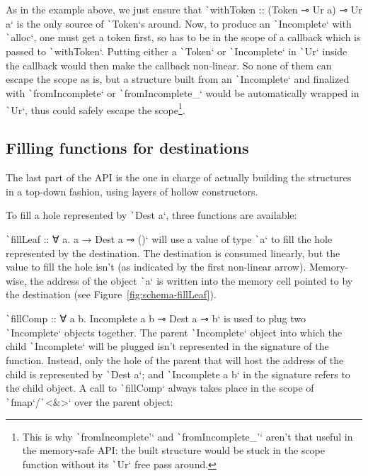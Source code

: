 \documentclass[english]{jflart}
\begin{document}
As in the example above, we just ensure that \texttt`withToken :: (Token ⊸ Ur a) ⊸ Ur a` is the only source of \texttt`Token`s around. Now, to produce an \texttt`Incomplete` with \texttt`alloc`, one must get a token first, so has to be in the scope of a callback which is passed to \texttt`withToken`. Putting either a \texttt`Token` or \texttt`Incomplete` in \texttt`Ur` inside the callback would then make the callback non-linear. So none of them can escape the scope as is, but a structure built from an \texttt`Incomplete` and finalized with \texttt`fromIncomplete` or \texttt`fromIncomplete_` would be automatically wrapped in \texttt`Ur`, thus could safely escape the scope\footnote{This is why \texttt`fromIncomplete'` and \texttt`fromIncomplete_'` aren't that useful in the memory-safe API: the built structure would be stuck in the scope function without its \texttt`Ur` free pass around.}.

\subsection{Filling functions for destinations}

The last part of the API is the one in charge of actually building the structures in a top-down fashion, using layers of hollow constructors. 

To fill a hole represented by \texttt`Dest a`, three functions are available:

\texttt`fillLeaf :: ∀ a. a → Dest a ⊸ ()` will use a value of type \texttt`a` to fill the hole represented by the destination. The destination is consumed linearly, but the value to fill the hole isn't (as indicated by the first non-linear arrow). Memory-wise, the address of the object \texttt`a` is written into the memory cell pointed to by the destination (see Figure~\ref{fig:schema-fillLeaf}).

\texttt`fillComp :: ∀ a b. Incomplete a b ⊸ Dest a ⊸ b` is used to plug two \texttt`Incomplete` objects together. The parent \texttt`Incomplete` object into which the child \texttt`Incomplete` will be plugged isn't represented in the signature of the function. Instead, only the hole of the parent that will host the address of the child is represented by \texttt`Dest a`; and \texttt`Incomplete a b` in the signature refers to the child object. A call to \texttt`fillComp` always takes place in the scope of \texttt`fmap`/\texttt`<&>` over the parent object:
\end{document}

